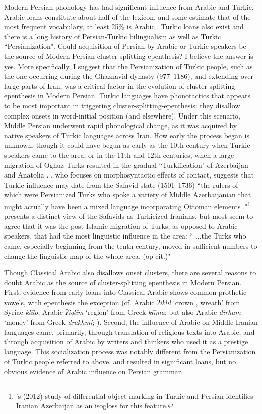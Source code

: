 \documentclass[output=paper,
modfonts
]{LSP/langsci}
\begin{document}
Modern Persian phonology has had significant influence from Arabic and
Turkic. Arabic loans constitute about half of the lexicon, and some
estimate that of the most frequent vocabulary, at least 25\% is Arabic
\citep{perry2004a, perry2005a}. Turkic loans also exist and there is a long history
of Persian-Turkic bilingualism as well as Turkic ``Persianization". Could
acquisition of Persian by Arabic or Turkic speakers be the source of
Modern Persian cluster-splitting epenthesis? I believe the answer is
yes. More specifically, I suggest that the Persianization of Turkic
people, such as the one occurring during the Ghaznavid dynasty
(977--1186), and extending over large parts of Iran, was a critical
factor in the evolution of cluster-splitting epenthesis in Modern
Persian. Turkic languages have phonotactics that appears to be most
important in triggering cluster-splitting-epenthesis: they disallow
complex onsets in word-initial position (and elsewhere). Under this
scenario, Middle Persian underwent rapid phonological change, as it was
acquired by native speakers of Turkic languages across Iran. How early
the process began is unknown, though it could have begun as early as the
10th century when Turkic speakers came to the area, or in the 11th and
12th centuries, when a large migration of Oghuz Turks resulted in the
gradual ``Turkification" of Azerbaijan and Anatolia \citep{frye2004a}. \citet{key2012a}, who focuses on morphosyntactic effects of contact, suggests that
Turkic influence may date from the Safavid state (1501--1736) ``the rulers
of which were Persianized Turks who spoke a variety of Middle
Azerbaijanian that might actually have been a mixed language
incorporating Ottoman elements \cite[228]{stein2005a}."\footnote{\citeauthor{key2012a}'s (2012)
  study of differential object marking in Turkic and Persian identifies
  Iranian Azerbaijan as an isogloss for this feature.} \citet{frye2004a}
presents a distinct view of the Safavids as Turkicized Iranians, but
most seem to agree that it was the post-Islamic migration of Turks, as
opposed to Arabic speakers, that had the most linguistic influence in
the area: `` ...the Turks who came, especially beginning from the tenth
century, moved in sufficient numbers to change the linguistic map of the
whole area. (op cit.)"

Though Classical Arabic also disallows onset clusters, there are several
reasons to doubt Arabic as the source of cluster-splitting epenthesis in
Modern Persian. First, evidence from early loans into Classical Arabic
shows common prothetic vowels, with epenthesis the exception (cf. Arabic
\emph{ʔiklīl} `crown , wreath' from Syriac \emph{klīlo}, Arabic
\emph{ʔiqlīm} `region' from Greek \emph{klīma}; but also Arabic
\emph{dirham} `money' from Greek \emph{drakhmi}; \citealt{bueasa2015a}). Second,
the influence of Arabic on Middle Iranian languages came, primarily,
through translation of religious texts into Arabic, and through
acquisition of Arabic by writers and thinkers who used it as a prestige
language. This socialization process was notably different from the
Persianization of Turkic people referred to above, and resulted in
significant loans, but no obvious evidence of Arabic influence on
Persian grammar.
\end{document}
